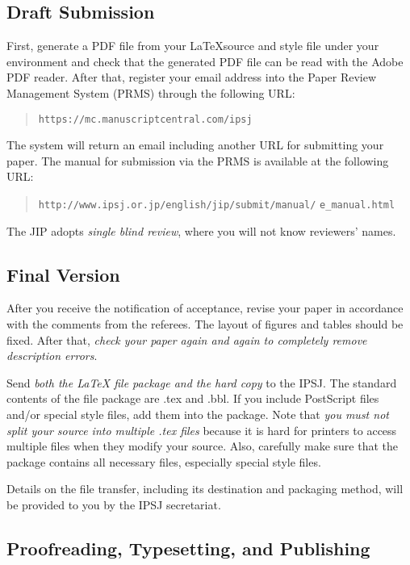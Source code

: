 \documentclass[english,preprint,JIP]{ipsj}
\def\|{\verb|}
\begin{document}


%2.2
\subsection{Draft Submission}

First, generate a PDF file from your \LaTeX source and style file under
your {\LaTeXe} environment and check that the generated PDF file can be
read with the Adobe PDF reader.  After that, register your email address
into the Paper Review Management System (PRMS) through the following
URL:
\begin{quote}
 \small
 \|https://mc.manuscriptcentral.com/ipsj|
\end{quote}

\noindent
The system will return an email including another URL for submitting
your paper. The manual for submission via the PRMS is available at the
following URL: 
\begin{quote}
 \small
 \|http://www.ipsj.or.jp/english/jip/submit/manual/|
 \|e_manual.html|
\end{quote}

The JIP adopts \textit{single blind review}, 
where you will not know reviewers' names.


\subsection{Final Version}

After you receive the notification of acceptance, revise your paper in
accordance with the comments from the referees.
The layout of
figures and tables should be fixed. After that, \textit{check your paper
again and again to completely remove description errors}.

Send \textit{both the {\LaTeX} file package and the hard copy} to the
IPSJ\@. The standard contents of the file package are .tex and .bbl. If
you include PostScript files and/or special style files, add them into
the package. Note that \textit{you must not split your source into
multiple .tex files} because it is hard for printers to access multiple
files when they modify your source. Also, carefully make sure that the
package contains all necessary files, especially special style files.

Details on the file transfer, including its destination and packaging
method, will be provided to you by the IPSJ secretariat.

\subsection{Proofreading, Typesetting, and Publishing}
\end{document}
